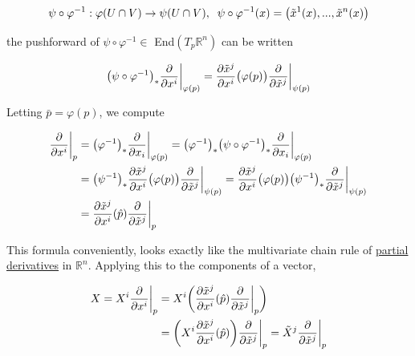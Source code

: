 \documentclass{article}
\begin{document}
        \begin{equation}
          \psi \circ \varphi^{-1} : \varphi(U \cap V) \to \psi (U \cap V), \;\; \psi \circ \varphi^{-1} (x) = \big( \Tilde{x}^1 (x), ..., \Tilde{x}^n (x) \big)
        \end{equation}

      the pushforward of $\psi \circ \varphi^{-1} \in$ End$(T_p \mathbb{R}^n)$ can be written

        \begin{equation}
          \big( \psi \circ \varphi^{-1}\big)_* \frac{\partial}{\partial x^i} \bigg|_{\varphi(p)} = \frac{\partial \Tilde{x}^j}{\partial x^i} \big( \varphi(p) \big) \frac{\partial}{\partial \Tilde{x}^j} \bigg|_{\psi(p)}
        \end{equation}

      Letting $\bar{p} = \varphi(p)$, we compute

      \begin{align*}
        \frac{\partial}{\partial x^i} \bigg|_p & = \big( \varphi^{-1} \big)_* \frac{\partial}{\partial x_i} \bigg|_{\varphi(p)} = \big( \varphi^{-1} \big)_* \big( \psi \circ \varphi^{-1} \big)_* \frac{\partial}{\partial x_i} \bigg|_{\varphi(p)} \\ 
        & = \big( \psi^{-1}\big)_* \frac{\partial \Tilde{x}^j}{\partial x^i} \big( \varphi(p)\big) \frac{\partial}{\partial \Tilde{x}^j} \bigg|_{\psi(p)} = \frac{\partial \Tilde{x}^j}{\partial x^i} \big( \varphi(p)\big) \big( \psi^{-1}\big)_* \frac{\partial}{\partial \Tilde{x}^j} \bigg|_{\psi (p)} \\
        & = \frac{\partial \Tilde{x}^j}{\partial x^i} (\hat{p}) \frac{\partial}{\partial \Tilde{x}^j} \bigg|_p
      \end{align*}

      This formula conveniently, looks exactly like the multivariate chain rule of \hyperref[mv-def:partial-derivative]{partial derivatives} in $\mathbb{R}^n$. Applying this to the components of a vector, 

      \begin{align*}
        X = X^i \frac{\partial}{\partial x^i} \bigg|_p & = X^i \bigg( \frac{\partial \Tilde{x}^j}{\partial x^i} (\hat{p}) \frac{\partial}{\partial \Tilde{x}^j} \bigg|_p \bigg) \\
        & = \bigg(X^i \frac{\partial \Tilde{x}^j}{\partial x^i} (\hat{p}) \bigg) \frac{\partial}{\partial \Tilde{x}^j} \bigg|_p =
        \Tilde{X}^j \frac{\partial}{\partial \Tilde{x}^j} \bigg|_p
      \end{align*}
\end{document}
